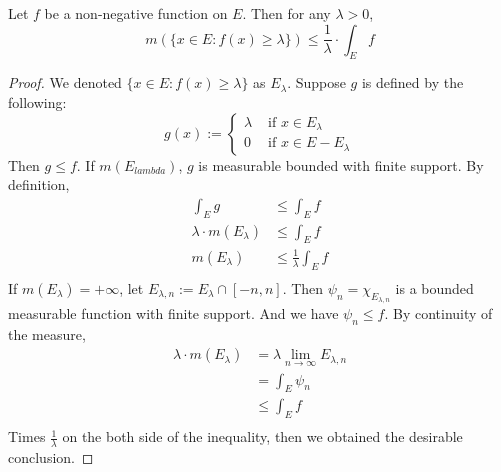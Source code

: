 \documentclass[lang=en, 12pt]{elegantbook}
\begin{document}
            \begin{lemma}
                Let $f$ be a non-negative function on $E$. Then for any $\lambda >0$,
                \begin{equation}
                    m(\{x \in E: f(x) \geq \lambda\}) \leq \frac{1}{\lambda} \cdot \int_E f
                \end{equation}
            \end{lemma}
            \begin{proof}
                We denoted $\{x \in E: f(x) \geq \lambda\}$ as $E_{\lambda}$. Suppose $g$ is defined by the following:
            $$g(x) := \left\{ \begin{matrix}
                \lambda & \mbox{ if } x \in E_{\lambda}\\
                0 & \mbox{ if } x \in E- E_{\lambda}
            \end{matrix} \right.$$
            Then $g \leq f$. If $m(E_{lambda})$, $g$ is measurable bounded with finite support. By definition, 
            \begin{equation*}
                \begin{aligned}
                    \int_E g &\leq \int_E f\\
                    \lambda \cdot m(E_{\lambda}) &\leq \int_E f\\
                    m(E_{\lambda}) &\leq \frac{1}{\lambda}\int_E f\\
                \end{aligned}
            \end{equation*} 
            If $m(E_{\lambda}) = +\infty$, let $E_{\lambda, n} := E_{\lambda} \cap [-n,n]$. Then $\psi_n = \chi_{E_{\lambda, n}}$
            is a bounded measurable function with finite support. And we have $\psi_n \leq f$. By continuity of the measure,
            \begin{equation*}
                \begin{aligned}
                    \lambda \cdot m(E_{\lambda}) &= \lambda \lim_{n \to \infty} E_{\lambda, n}\\ &= \int_E \psi_n\\ &\leq \int_E f\\
                \end{aligned}
            \end{equation*}
            Times $\frac{1}{\lambda}$ on the both side of the inequality, then we obtained the desirable conclusion.                 
            \end{proof}
\end{document}
